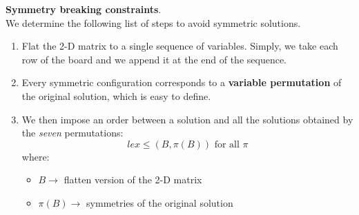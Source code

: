 \begin{example}[title = Symmetries of n-queens problem]
    \textbf{Symmetry breaking constraints}. \\
    We determine the following list of steps to avoid symmetric solutions. 
    \begin{enumerate}
        \item Flat the 2-D matrix to a single sequence of variables. Simply, we take each row of the board and we append it at the end of the sequence.
        \item Every symmetric configuration corresponds to a \textbf{variable permutation} of the original solution, which is easy to define.
        \item We then impose an order between a solution and all the solutions obtained by the \textit{seven} permutations:
        $$ \textit{lex} \leq (B, \pi(B)) \text{ for all } \pi $$
        where: 
        \begin{itemize}
            \renewcommand{\labelitemi}{-}
            \item $B \rightarrow$ flatten version of the 2-D matrix
            \item $\pi(B) \rightarrow$ symmetries of the original solution
        \end{itemize}
    \end{enumerate}
\end{example} 